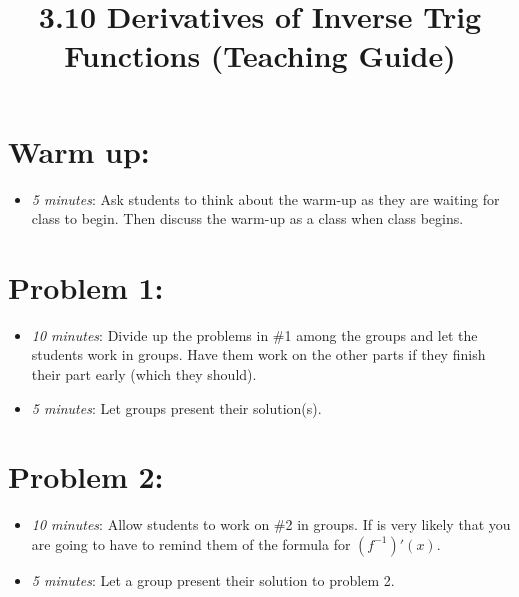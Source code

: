 \documentclass[handout,nooutcomes]{ximera}
\title{3.10 Derivatives of Inverse Trig Functions (Teaching Guide)}
\begin{document}
\begin{abstract}		\end{abstract}
\maketitle


\section*{Warm up:} 
	
	\begin{itemize}
	
	\item  \emph{5 minutes}:  Ask students to think about the warm-up as they are waiting for class to begin.  Then discuss the warm-up as a class when class begins.
	
	
	
	\end{itemize}


\section*{Problem 1:}

	\begin{itemize}
	
	\item  \emph{10 minutes}:  Divide up the problems in \#1 among the groups and let the students work in groups.  Have them work on the other parts if they finish their part early (which they should).  
	
	\item  \emph{5 minutes}:  Let groups present their solution(s).
	
	\end{itemize}



\section*{Problem 2:}

	\begin{itemize}
	
	\item  \emph{10 minutes}:  Allow students to work on \#2 in groups.  If is very likely that you are going to have to remind them of the formula for $(f^{-1})'(x)$.  
		
	\item  \emph{5 minutes}:  Let a group present their solution to problem 2.
			
	\end{itemize}
	
\end{document}
